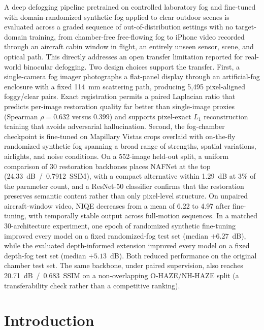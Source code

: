 \documentclass{optica-article}
\begin{document}
\begin{abstract*}
A deep defogging pipeline pretrained on controlled laboratory fog
and fine-tuned with domain-randomized synthetic fog applied to
clear outdoor scenes is evaluated across a graded sequence of
out-of-distribution settings with no target-domain training, from
chamber-free free-flowing fog to iPhone video recorded through an
aircraft cabin window in flight, an entirely unseen sensor, scene,
and optical path. This directly addresses an open transfer
limitation reported for real-world binocular defogging. Two design
choices support the transfer. First, a single-camera fog imager
photographs a flat-panel display through an artificial-fog
enclosure with a fixed 114~mm scattering path, producing 5{,}495
pixel-aligned foggy/clear pairs. Exact registration permits a
paired Laplacian ratio that predicts per-image restoration quality
far better than single-image proxies (Spearman $\rho = 0.632$
versus $0.399$) and supports pixel-exact $L_1$ reconstruction
training that avoids adversarial hallucination. Second, the
fog-chamber checkpoint is fine-tuned on Mapillary Vistas crops
overlaid with on-the-fly randomized synthetic fog spanning a broad
range of strengths, spatial variations, airlights, and noise
conditions. On a 552-image held-out split, a uniform comparison of
30 restoration backbones places NAFNet at the top
(24.33~dB~/~0.7912~SSIM), with a compact alternative within
1.29~dB at 3\% of the parameter count, and a ResNet-50 classifier
confirms that the restoration preserves semantic content rather
than only pixel-level structure. On unpaired aircraft-window
video, NIQE decreases from a mean of 6.22 to 4.97 after
fine-tuning, with temporally stable output across full-motion
sequences. In a matched 30-architecture experiment, one epoch
of randomized synthetic fine-tuning improved every model on a
fixed randomized-fog test set (median $+6.27$~dB), while the evaluated
depth-informed extension improved every model on a fixed depth-fog test
set (median $+5.13$~dB). Both reduced performance on the original
chamber test set. The same backbone, under
paired supervision, also reaches 20.71~dB~/~0.683~SSIM on a
non-overlapping O-HAZE/NH-HAZE split (a transferability check
rather than a competitive ranking).
\end{abstract*}

\section{Introduction}
\label{sec:intro}
 
\end{document}

